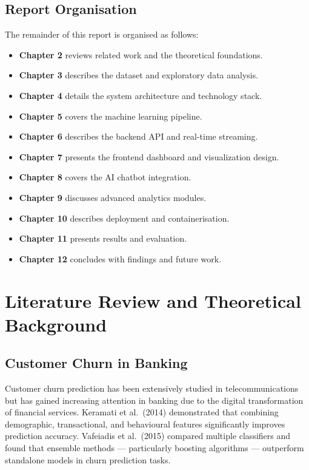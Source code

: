 \documentclass[12pt, a4paper]{report}
\begin{document}
\section{Report Organisation}

The remainder of this report is organised as follows:
\begin{itemize}
    \item \textbf{Chapter 2} reviews related work and the theoretical foundations.
    \item \textbf{Chapter 3} describes the dataset and exploratory data analysis.
    \item \textbf{Chapter 4} details the system architecture and technology stack.
    \item \textbf{Chapter 5} covers the machine learning pipeline.
    \item \textbf{Chapter 6} describes the backend API and real-time streaming.
    \item \textbf{Chapter 7} presents the frontend dashboard and visualization design.
    \item \textbf{Chapter 8} covers the AI chatbot integration.
    \item \textbf{Chapter 9} discusses advanced analytics modules.
    \item \textbf{Chapter 10} describes deployment and containerisation.
    \item \textbf{Chapter 11} presents results and evaluation.
    \item \textbf{Chapter 12} concludes with findings and future work.
\end{itemize}


\chapter{Literature Review and Theoretical Background}

\section{Customer Churn in Banking}

Customer churn prediction has been extensively studied in telecommunications but has gained increasing attention in banking due to the digital transformation of financial services. Keramati et al.\ (2014) demonstrated that combining demographic, transactional, and behavioural features significantly improves prediction accuracy. Vafeiadis et al.\ (2015) compared multiple classifiers and found that ensemble methods --- particularly boosting algorithms --- outperform standalone models in churn prediction tasks.
\end{document}
